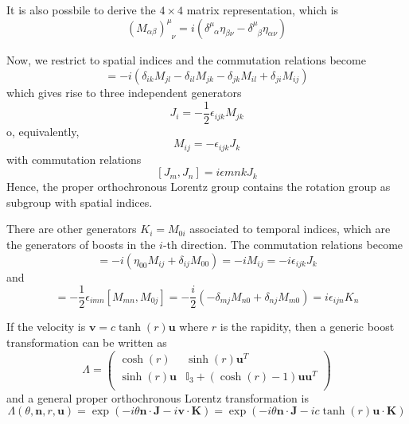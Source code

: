     It is also possbile to derive the $4 \times 4$ matrix representation, which is 
    \begin{equation*}
        (M_{\alpha\beta})^\mu_{\phantom \mu \nu} = i (\delta^\mu_{\phantom \mu \alpha} \eta_{\beta \nu} - \delta^\mu_{\phantom \mu \beta} \eta_{\alpha \nu})
    \end{equation*}

    Now, we restrict to spatial indices and the commutation relations become
    \begin{equation*}
        [M_{ij}, M_{kl}] = - i (\delta_{ik} M_{jl} - \delta_{il} M_{jk} - \delta_{jk} M_{il} + \delta_{ji} M_{ij})
    \end{equation*}
    which gives rise to three independent generators 
    \begin{equation*}
        J_i = - \frac{1}{2} \epsilon_{ijk} M_{jk}
    \end{equation*}
    o, equivalently,
    \begin{equation*}
        M_{ij} = - \epsilon_{ijk} J_k
    \end{equation*}
    with commutation relations 
    \begin{equation}\label{commjj}
        [J_m, J_n] = i \epsilon{mnk} J_k
    \end{equation}
    Hence, the proper orthochronous Lorentz group contains the rotation group as subgroup with spatial indices.

    There are other generators $K_i = M_{0i}$ associated to temporal indices, which are the generators of boosts in the $i$-th direction. The commutation relations become 
    \begin{equation*}
        [K_i, K_j] = -i(\eta_{00} M_{ij} + \delta_{ij} M_{00}) = - iM_{ij} = - i \epsilon_{ijk} J_k
    \end{equation*}
    and 
    \begin{equation*}
        [J_i, K_j] = - \frac{1}{2} \epsilon_{imn} [M_{mn}, M_{0j}] = - \frac{i}{2} (- \delta_{mj} M_{n0} + \delta_{nj} M_{m0}) = i \epsilon_{ijn} K_n
    \end{equation*}

    If the velocity is $\mathbf v = c \tanh(r) \mathbf u$ where $r$ is the rapidity, then a generic boost transformation can be written as 
    \begin{equation*}
        \Lambda = \begin{pmatrix}
            \cosh(r) & \sinh(r) \mathbf u^T \\
            \sinh(r) \mathbf u & \mathbb I_3 + (\cosh(r)-1) \mathbf u \mathbf u^T \\
        \end{pmatrix}
    \end{equation*}
    and a general proper orthochronous Lorentz transformation is 
    \begin{equation*}
        \Lambda (\theta, \mathbf n, r, \mathbf u) = \exp(-i \theta \mathbf n \cdot \mathbf J - i \mathbf v \cdot \mathbf K) = \exp(- i \theta \mathbf n \cdot \mathbf J - i c \tanh(r) \mathbf u \cdot \mathbf K)
    \end{equation*}

